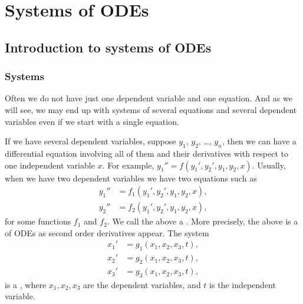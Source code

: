 \chapter{Systems of ODEs} \label{sys:chapter}


\section{Introduction to systems of ODEs} \label{sec:introtosys}



\subsection{Systems}

Often we do not have just one dependent variable and one equation.
And as we will see, we may end up with systems of several
equations and several dependent variables even if we start with a single
equation.

If we have several dependent variables,
suppose $y_1$, $y_2$, \ldots, $y_n$,
then
we can have a differential equation involving all of them and their
derivatives with respect to one independent variable $x$.
For example, $y_1'' = f(y_1',y_2',y_1,y_2,x)$.
Usually, when we have two dependent variables we have two equations
such as
\begin{equation*}
\begin{aligned}
y_1'' & = f_1(y_1',y_2',y_1,y_2,x) , \\
y_2'' & = f_2(y_1',y_2',y_1,y_2,x) ,
\end{aligned}
\end{equation*}
for some functions $f_1$ and $f_2$.  We call the above a
\emph{}.
More precisely, the above is a \emph{}
of ODEs as second
order derivatives appear.
The system
\begin{equation*}
\begin{aligned}
x_1' & = g_1(x_1,x_2,x_3,t) , \\
x_2' & = g_2(x_1,x_2,x_3,t) , \\
x_3' & = g_3(x_1,x_2,x_3,t) ,
\end{aligned}
\end{equation*}
is a \emph{}, where $x_1,x_2,x_3$ are
the dependent variables,
and $t$ is the independent variable.

